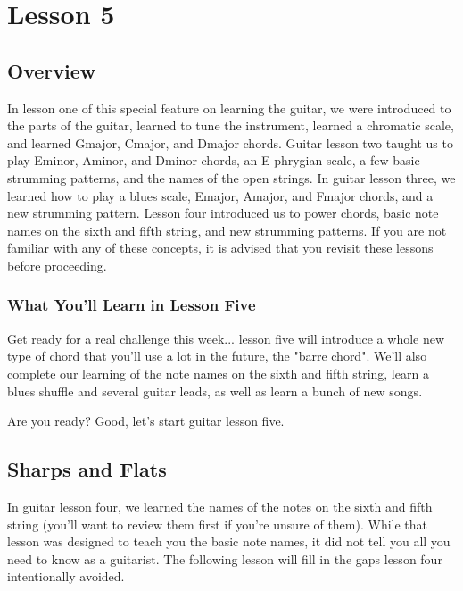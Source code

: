 \chapter{Lesson 5}
\section{Overview}
In lesson one of this special feature on learning the guitar, we were introduced to the parts of the guitar, learned to tune the instrument, learned a chromatic scale, and learned Gmajor, Cmajor, and Dmajor chords. Guitar lesson two taught us to play Eminor, Aminor, and Dminor chords, an E phrygian scale, a few basic strumming patterns, and the names of the open strings. In guitar lesson three, we learned how to play a blues scale, Emajor, Amajor, and Fmajor chords, and a new strumming pattern. Lesson four introduced us to power chords, basic note names on the sixth and fifth string, and new strumming patterns. If you are not familiar with any of these concepts, it is advised that you revisit these lessons before proceeding. 

\subsection{What You'll Learn in Lesson Five}

Get ready for a real challenge this week... lesson five will introduce a whole new type of chord that you'll use a lot in the future, the "barre chord". We'll also complete our learning of the note names on the sixth and fifth string, learn a blues shuffle and several guitar leads, as well as learn a bunch of new songs.

Are you ready? Good, let's start guitar lesson five. 

\section{Sharps and Flats}
In guitar lesson four, we learned the names of the notes on the sixth and fifth string (you'll want to review them first if you're unsure of them). While that lesson was designed to teach you the basic note names, it did not tell you all you need to know as a guitarist. The following lesson will fill in the gaps lesson four intentionally avoided.

